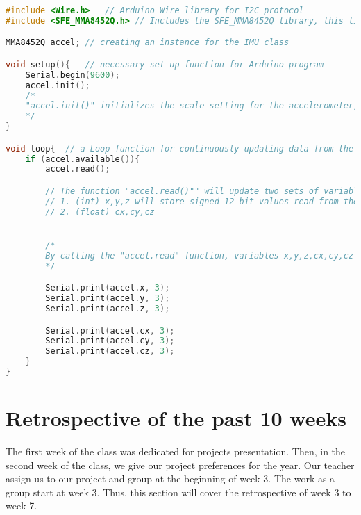 \documentclass[letterpaper,10pt,onecolumn]{IEEEtran}
\begin{document}
\begin{lstlisting}[language=c]
#include <Wire.h>	// Arduino Wire library for I2C protocol 
#include <SFE_MMA8452Q.h> // Includes the SFE_MMA8452Q library, this library depends on the in using IMU model

MMA8452Q accel;	// creating an instance for the IMU class

void setup(){	// necessary set up function for Arduino program 
	Serial.begin(9600);	
	accel.init();
	/* 
	"accel.init()" initializes the scale setting for the accelerometer, MMA8452Q supports SCALE_2G, SCALE_4G and SCALE_8G, they represent the scale of +/-2g, 4g, and 8g respectively, so for instance, using 2g scale will be a function like "accel.init(SCALE_2G)"
	*/
}

void loop{	// a Loop function for continuously updating data from the accelerometer  
	if (accel.available()){
	    accel.read();	

		// The function "accel.read()"" will update two sets of variables: 
		// 1. (int) x,y,z will store signed 12-bit values read from the accelerometer
		// 2. (float) cx,cy,cz 


		/* 
		By calling the "accel.read" function, variables x,y,z,cx,cy,cz in "accel" class have been updated, the following code allows the program to print out all data continuously on the Arduino Serial monitor, and these variables would be the data to be processed by the aligned algorithm in our system. 
		*/

		Serial.print(accel.x, 3);
		Serial.print(accel.y, 3);
		Serial.print(accel.z, 3);

		Serial.print(accel.cx, 3);
		Serial.print(accel.cy, 3);
		Serial.print(accel.cz, 3);
	}
}

\end{lstlisting}


\newpage
\section{Retrospective of the past 10 weeks}
The first week of the class was dedicated for projects presentation. Then, in the second week of the class, we give our project preferences for the year. Our teacher assign us to our project and group at the beginning of week 3. The work as a group start at week 3. Thus, this section will cover the retrospective of week 3 to week 7.
\end{document}
